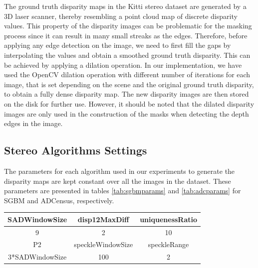 The ground truth disparity maps in the Kitti stereo dataset are generated by a 3D laser scanner, thereby resembling
a point cloud map of discrete disparity values. This property of the disparity images 
can be problematic for the masking process since it can result in many small streaks as the edges.
Therefore, before applying any edge
detection on the image, we need to first fill the gaps by interpolating the values and obtain a smoothed ground truth disparity.
This can be achieved by applying a dilation operation.
In our implementation, we have used the OpenCV dilation operation with different number of iterations for each image, that is set depending on the scene 
and the original ground truth disparity, to obtain a fully dense disparity map. 
The new disparity images are then stored on the disk for further use.
However, it should be noted that the dilated disparity images are only used in the construction of the masks when detecting the depth
edges in the image.

\subsection{Stereo Algorithms Settings}
The parameters for each algorithm used in our experiments to generate the disparity
maps are kept constant over all the images in the dataset. These parameters are presented in tables \ref{tab:sgbmparams} and \ref{tab:adcparams} 
for SGBM and ADCensus, respectively. \newline

{\footnotesize
\begin{minipage}{0.8\linewidth}
\begin{center}
\label{tab:sgbmparams}
\begin{tabular}{ |c|c|c| }
\hline
SADWindowSize & disp12MaxDiff & uniquenessRatio\\  \hline
9 & 2 & 10 \\ \hline
P2 & speckleWindowSize & speckleRange \\ \hline
3*SADWindowSize & 100 & 2  \\ \hline
\end{tabular}
\end{center}
\end{minipage} \newline \newline
}

